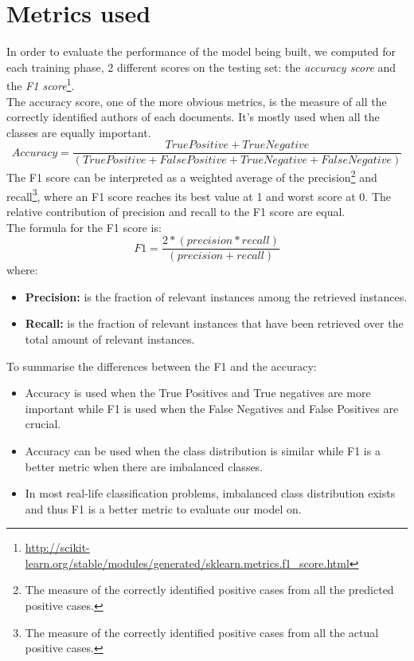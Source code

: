 \section{Metrics used}
In order to evaluate the performance of the model being built, we computed for each training phase, 2 different scores on the testing set: the \textit{accuracy score} and the \textit{F1 score}\footnote{\url{http://scikit-learn.org/stable/modules/generated/sklearn.metrics.f1_score.html}}.\\ 
The accuracy score, one of the more obvious metrics, is the measure of all the correctly identified authors of each documents. It's mostly used when all the classes are equally important.
\begin{equation}
Accuracy = \frac{True Positive + True Negative}{(True Positive + False Positive + True Negative + False Negative)}
\end{equation}
The F1 score can be interpreted as a weighted average of the precision\footnote{The measure of the correctly identified positive cases from all the predicted positive cases.} and recall\footnote{The measure of the correctly identified positive cases from all the actual positive cases.}, where an F1 score reaches its best value at 1 and worst score at 0. The relative contribution of precision and recall to the F1 score are equal.\\The formula for the F1 score is:\\
\begin{equation}
F1 = \frac{2 * (precision * recall)}{(precision + recall)}
\end{equation}
where:
\begin{itemize}
	\item \textbf{Precision:} is the fraction of relevant instances among the retrieved instances.
	\item \textbf{Recall:} is the fraction of relevant instances that have been retrieved over the total amount of relevant instances.
\end{itemize}

To summarise the differences between the F1 and the accuracy:
\begin{itemize}
	\item Accuracy is used when the True Positives and True negatives are more important while F1 is used when the False Negatives and False Positives are crucial.
	\item Accuracy can be used when the class distribution is similar while F1 is a better metric when there are imbalanced classes.
	\item In most real-life classification problems, imbalanced class distribution exists and thus F1 is a better metric to evaluate our model on.
\end{itemize}

